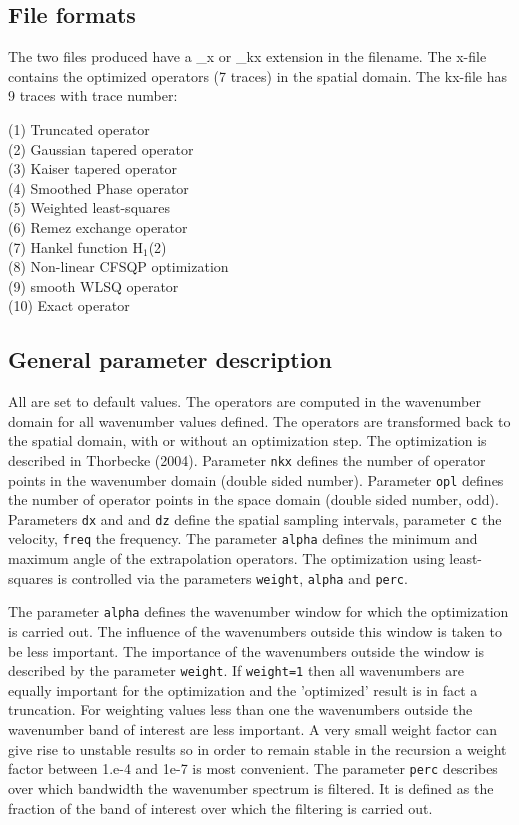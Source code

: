 \subsection{File formats}

The two files produced have a \_x or \_kx extension in the filename.
The x-file contains the optimized operators (7 traces) in the spatial domain.
The kx-file has 9 traces with trace number:

 
(1) Truncated operator \\ (2) Gaussian tapered operator \\ (3) Kaiser tapered operator \\  (4) Smoothed Phase operator \\ (5) Weighted least-squares \\ (6) Remez exchange operator \\ (7) Hankel function H$_1$(2) \\ (8) Non-linear CFSQP optimization \\ (9) smooth WLSQ operator \\ (10) Exact operator 

\subsection{General parameter description}

All are set to default values. The operators are computed in the wavenumber domain for all wavenumber values defined. The operators
are transformed back to the spatial domain, with or without an optimization step. The optimization is described  in Thorbecke (2004). Parameter {\tt nkx} defines the number of operator points in the wavenumber domain (double sided number). Parameter {\tt opl} defines the number of operator points in the space domain (double sided number, odd). Parameters {\tt dx} and and {\tt dz} define the spatial sampling intervals, parameter {\tt c} the velocity, {\tt freq} the frequency. The parameter {\tt alpha} defines the minimum and maximum angle of the extrapolation operators. The optimization using least-squares is controlled via the parameters {\tt weight}, {\tt alpha} and {\tt perc}.

The parameter {\tt alpha} defines the wavenumber window for which the optimization is carried out. The influence of the wavenumbers outside this window is taken to be less important. The importance of the wavenumbers outside the window is described by the parameter {\tt weight}. If {\tt weight=1} then all wavenumbers are equally important for the optimization and the 'optimized' result is in fact a truncation. For weighting values less than one the wavenumbers outside the wavenumber band of interest are less important. A very small weight factor can give rise to unstable results so in order to remain stable in the recursion a weight factor between 1.e-4 and 1e-7 is most convenient. The parameter {\tt perc} describes over which bandwidth the wavenumber spectrum is filtered. It is defined as the fraction of the band of interest over which the filtering is carried out.

